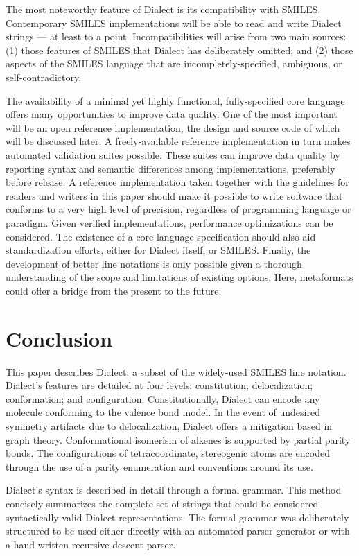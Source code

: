 \documentclass{article}
\begin{document}
The most noteworthy feature of Dialect is its compatibility with SMILES. Contemporary SMILES implementations will be able to read and write Dialect strings --- at least to a point. Incompatibilities will arise from two main sources: (1) those features of SMILES that Dialect has deliberately omitted; and (2) those aspects of the SMILES language that are incompletely-specified, ambiguous, or self-contradictory.

The availability of a minimal yet highly functional, fully-specified core language offers many opportunities to improve data quality. One of the most important will be an open reference implementation, the design and source code of which will be discussed later. A freely-available reference implementation in turn makes automated validation suites possible. These suites can improve data quality by reporting syntax and semantic differences among implementations, preferably before release. A reference implementation taken together with the guidelines for readers and writers in this paper should make it possible to write software that conforms to a very high level of precision, regardless of programming language or paradigm. Given verified implementations, performance optimizations can be considered. The existence of a core language specification should also aid standardization efforts, either for Dialect itself, or SMILES. Finally, the development of better line notations is only possible given a thorough understanding of the scope and limitations of existing options. Here, metaformats could offer a bridge from the present to the future.

\section*{Conclusion}

This paper describes Dialect, a subset of the widely-\-used SMILES line notation. Dialect's features are detailed at four levels: constitution; delocalization; conformation; and configuration. Constitutionally, Dialect can encode any molecule conforming to the valence bond model. In the event of undesired symmetry artifacts due to delocalization, Dialect offers a mitigation based in graph theory. Conformational isomerism of alkenes is supported by partial parity bonds. The configurations of tetracoordinate, stereogenic atoms are encoded through the use of a parity enumeration and conventions around its use.

Dialect's syntax is described in detail through a formal grammar. This method concisely summarizes the complete set of strings that could be considered syntactically valid Dialect representations. The formal grammar was deliberately structured to be used either directly with an automated parser generator or with a hand-written recursive-descent parser.
\end{document}
